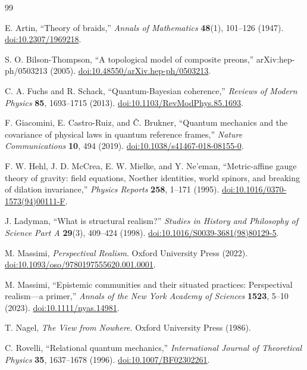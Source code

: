 \documentclass[11pt]{article}
\theoremstyle{definition}
\theoremstyle{remark}
\begin{document}
\begin{thebibliography}{99}
\raggedright
\small

E. Artin, ``Theory of braids,'' \emph{Annals of Mathematics} \textbf{48}(1), 101--126 (1947). \href{https://doi.org/10.2307/1969218}{doi:10.2307/1969218}.

S. O. Bilson-Thompson, ``A topological model of composite preons,'' arXiv:hep-ph/0503213 (2005). \href{https://doi.org/10.48550/arXiv.hep-ph/0503213}{doi:10.48550/arXiv.hep-ph/0503213}.

C. A. Fuchs and R. Schack, ``Quantum-Bayesian coherence,'' \emph{Reviews of Modern Physics} \textbf{85}, 1693--1715 (2013). \href{https://doi.org/10.1103/RevModPhys.85.1693}{doi:10.1103/RevModPhys.85.1693}.

F. Giacomini, E. Castro-Ruiz, and \v{C}. Brukner, ``Quantum mechanics and the covariance of physical laws in quantum reference frames,'' \emph{Nature Communications} \textbf{10}, 494 (2019). \href{https://doi.org/10.1038/s41467-018-08155-0}{doi:10.1038/s41467-018-08155-0}.

F. W. Hehl, J. D. McCrea, E. W. Mielke, and Y. Ne'eman, ``Metric-affine gauge theory of gravity: field equations, Noether identities, world spinors, and breaking of dilation invariance,'' \emph{Physics Reports} \textbf{258}, 1--171 (1995). \href{https://doi.org/10.1016/0370-1573(94)00111-F}{doi:10.1016/0370-1573(94)00111-F}.

J. Ladyman, ``What is structural realism?'' \emph{Studies in History and Philosophy of Science Part A} \textbf{29}(3), 409--424 (1998). \href{https://doi.org/10.1016/S0039-3681(98)80129-5}{doi:10.1016/S0039-3681(98)80129-5}.

M. Massimi, \emph{Perspectival Realism}. Oxford University Press (2022). \href{https://doi.org/10.1093/oso/9780197555620.001.0001}{doi:10.1093/oso/9780197555620.001.0001}.

M. Massimi, ``Epistemic communities and their situated practices: Perspectival realism---a primer,'' \emph{Annals of the New York Academy of Sciences} \textbf{1523}, 5--10 (2023). \href{https://doi.org/10.1111/nyas.14981}{doi:10.1111/nyas.14981}.

T. Nagel, \emph{The View from Nowhere}. Oxford University Press (1986).

C. Rovelli, ``Relational quantum mechanics,'' \emph{International Journal of Theoretical Physics} \textbf{35}, 1637--1678 (1996). \href{https://doi.org/10.1007/BF02302261}{doi:10.1007/BF02302261}.


\end{thebibliography}
\end{document}
